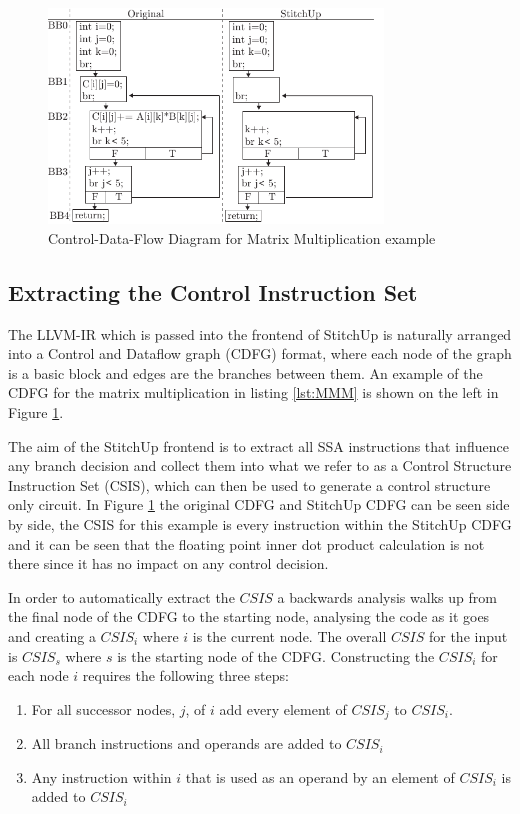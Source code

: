 \begin{figure}[h]
\centering
\includegraphics[width=3.5in]{./imgs/mmm_cdfg.pdf}
\caption{Control-Data-Flow Diagram for Matrix Multiplication example}
\label{fig:mmm_cdfg}
\end{figure}

\subsection{Extracting the Control Instruction Set}
The LLVM-IR which is passed into the frontend of StitchUp is naturally arranged into a Control and Dataflow graph (CDFG) format,
where each node of the graph is a basic block and edges are the branches between them.
An example of the CDFG for the matrix multiplication in listing \ref{lst:MMM} is shown on the left in Figure \ref{fig:mmm_cdfg}.

The aim of the StitchUp frontend is to extract all SSA instructions that influence any branch decision and collect them into what
we refer to as a Control Structure Instruction Set (CSIS), which can then be used to generate a control structure only circuit.
In Figure \ref{fig:mmm_cdfg} the original CDFG and StitchUp CDFG can be seen side by side, the CSIS for this example
is every instruction within the StitchUp CDFG and it can be seen that the floating point inner dot product calculation
is not there since it has no impact on any control decision.

In order to automatically extract the $CSIS$ a backwards analysis walks up from the final node of the CDFG to the starting node, analysing
the code as it goes and creating a $CSIS_{i}$ where $i$ is the current node.
The overall $CSIS$ for the input is $CSIS_s$ where $s$ is the starting node of the CDFG.
Constructing the $CSIS_i$ for each node $i$ requires the following three steps:
\begin{enumerate}
    \item For all successor nodes, $j$, of $i$ add every element of $CSIS_j$ to $CSIS_i$.
    \item All branch instructions and operands are added to $CSIS_i$
    \item Any instruction within $i$ that is used as an operand by an element of $CSIS_i$ is added to $CSIS_i$
\end{enumerate}

